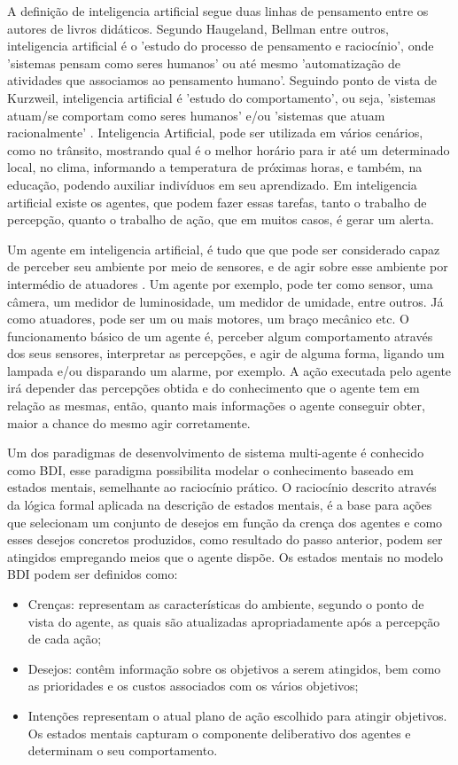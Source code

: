 \documentclass[12pt]{article}
\begin{document}
    A definição de inteligencia artificial segue duas linhas de pensamento entre os autores de livros didáticos. Segundo Haugeland, Bellman entre outros, inteligencia artificial é o 'estudo do processo de pensamento e raciocínio', onde 'sistemas pensam como seres humanos' ou até mesmo 'automatização de atividades que associamos ao pensamento humano'. Seguindo ponto de vista de Kurzweil, inteligencia artificial é 'estudo do comportamento', ou seja, 'sistemas atuam/se comportam como seres humanos' e/ou 'sistemas que atuam racionalmente' \cite{livro_IA_BU}. Inteligencia Artificial, pode ser utilizada em vários cenários, como no trânsito, mostrando qual é o melhor horário para ir até um determinado local, no clima, informando a temperatura de próximas horas, e também, na educação, podendo auxiliar indivíduos em seu aprendizado. Em inteligencia artificial existe os agentes, que podem fazer essas tarefas, tanto o trabalho de percepção, quanto o trabalho de ação, que em muitos casos, é gerar um alerta.

  Um agente em inteligencia artificial, é tudo que que pode ser considerado capaz de perceber seu ambiente por meio de sensores, e de agir sobre esse ambiente por intermédio de atuadores \cite{livro_IA_BU}. Um agente por exemplo, pode ter como sensor, uma câmera, um medidor de luminosidade, um medidor de umidade, entre outros. Já como atuadores, pode ser um ou mais motores, um braço mecânico etc. O funcionamento básico de um agente é, perceber algum comportamento através dos seus sensores, interpretar as percepções, e agir de alguma forma, ligando um lampada e/ou disparando um alarme, por exemplo. A ação executada pelo agente irá depender das percepções obtida e do conhecimento que o agente tem em relação as mesmas, então, quanto mais informações o agente conseguir obter, maior a chance do mesmo agir corretamente.

  Um dos paradigmas de desenvolvimento de sistema multi-agente é conhecido como BDI, esse paradigma possibilita modelar o conhecimento baseado em estados mentais, semelhante ao raciocínio prático. O raciocínio descrito através da lógica formal aplicada na descrição de estados mentais, é a base para ações que selecionam um conjunto de desejos em função da crença dos agentes e como esses desejos concretos produzidos, como resultado do passo anterior, podem ser atingidos empregando meios que o agente dispõe. Os estados mentais no modelo BDI podem ser definidos como: \cite{livro_IA_BU}
    \begin{itemize}
        \item Crenças: representam as características do ambiente, segundo o ponto de vista do agente, as quais são atualizadas apropriadamente após a percepção de cada ação;
        \item Desejos: contêm informação sobre os objetivos a serem atingidos, bem como as prioridades e os custos associados com os vários objetivos;
        \item Intenções representam o atual plano de ação escolhido para atingir objetivos. Os estados mentais capturam o componente deliberativo dos agentes e determinam o seu comportamento.
    \end{itemize}
\end{document}
